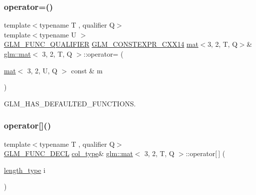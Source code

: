 \mbox{\label{structglm_1_1mat_3_013_00_012_00_01_t_00_01_q_01_4_a5665b9b94c9f67c56cc7d9f6ac569ef2}} 
\subsubsection{\texorpdfstring{operator=()}{operator=()}\hspace{0.1cm}{\footnotesize\ttfamily [3/3]}}
{\footnotesize\ttfamily template$<$typename T , qualifier Q$>$ \\
template$<$typename U $>$ \\
\mbox{\hyperlink{setup_8hpp_a33fdea6f91c5f834105f7415e2a64407}{G\+L\+M\+\_\+\+F\+U\+N\+C\+\_\+\+Q\+U\+A\+L\+I\+F\+I\+ER}} \mbox{\hyperlink{setup_8hpp_a4dd12abf5e1164bc57f3a34671d03844}{G\+L\+M\+\_\+\+C\+O\+N\+S\+T\+E\+X\+P\+R\+\_\+\+C\+X\+X14}} \mbox{\hyperlink{structglm_1_1mat}{mat}}$<$3, 2, T, Q$>$\& \mbox{\hyperlink{structglm_1_1mat}{glm\+::mat}}$<$ 3, 2, T, Q $>$\+::operator= (\begin{DoxyParamCaption}\item[{\mbox{\hyperlink{structglm_1_1mat}{mat}}$<$ 3, 2, U, Q $>$ const \&}]{m }\end{DoxyParamCaption})}



G\+L\+M\+\_\+\+H\+A\+S\+\_\+\+D\+E\+F\+A\+U\+L\+T\+E\+D\+\_\+\+F\+U\+N\+C\+T\+I\+O\+NS. 

\mbox{\label{structglm_1_1mat_3_013_00_012_00_01_t_00_01_q_01_4_ab749a8bb52d92b278cdfdd6de7201b03}} 
\subsubsection{\texorpdfstring{operator[]()}{operator[]()}\hspace{0.1cm}{\footnotesize\ttfamily [1/2]}}
{\footnotesize\ttfamily template$<$typename T , qualifier Q$>$ \\
\mbox{\hyperlink{setup_8hpp_ab2d052de21a70539923e9bcbf6e83a51}{G\+L\+M\+\_\+\+F\+U\+N\+C\+\_\+\+D\+E\+CL}} \mbox{\hyperlink{structglm_1_1mat_3_013_00_012_00_01_t_00_01_q_01_4_aa610dcaaae528e1eea8bdaaa435ad3a4}{col\+\_\+type}}\& \mbox{\hyperlink{structglm_1_1mat}{glm\+::mat}}$<$ 3, 2, T, Q $>$\+::operator\mbox{[}$\,$\mbox{]} (\begin{DoxyParamCaption}\item[{\mbox{\hyperlink{structglm_1_1mat_3_013_00_012_00_01_t_00_01_q_01_4_ac2f268fa5e899b2a6ad8139183ed61d4}{length\+\_\+type}}}]{i }\end{DoxyParamCaption})}

